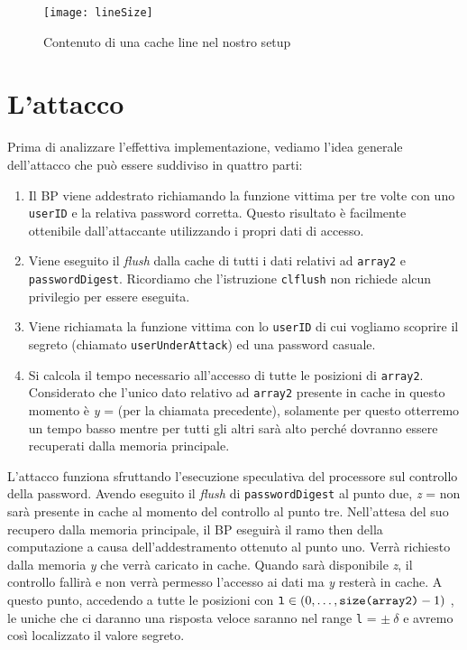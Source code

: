 		\begin{figure}
			\begin{center}
				\texttt{[image: lineSize]}
				\caption{Contenuto di una cache line nel nostro setup}
				\label{fig:lineSize}
			\end{center}
		\end{figure}
		
		\section{L'attacco}
			Prima di analizzare l'effettiva implementazione, vediamo l'idea generale dell'attacco che può essere suddiviso in quattro parti:
			
			\begin{enumerate}
				\item Il \ac{BP} viene addestrato richiamando la funzione vittima per tre volte con uno \texttt{userID} e la relativa password corretta. Questo risultato è facilmente ottenibile dall'attaccante utilizzando i propri dati di accesso.
				\item Viene eseguito il \emph{flush} dalla cache di tutti i dati relativi ad \texttt{array2} e \texttt{passwordDigest}. Ricordiamo che l'istruzione \texttt{clflush} non richiede alcun privilegio per essere eseguita.
				\item Viene richiamata la funzione vittima con lo \texttt{userID} di cui vogliamo scoprire il segreto (chiamato \texttt{userUnderAttack}) ed una password casuale.
				\item Si calcola il tempo necessario all'accesso di tutte le posizioni di \texttt{array2}. Considerato che l'unico dato relativo ad \texttt{array2} presente in cache in questo momento è \emph{y} =  (per la chiamata precedente), solamente per questo otterremo un tempo basso mentre per tutti gli altri sarà alto perché dovranno essere recuperati dalla memoria principale.
			\end{enumerate}
		
			L'attacco funziona sfruttando l'esecuzione speculativa del processore sul controllo della password. Avendo eseguito il \emph{flush} di \texttt{passwordDigest} al punto due, \emph{z} =  non sarà presente in cache al momento del controllo al punto tre. Nell'attesa del suo recupero dalla memoria principale, il \ac{BP} eseguirà il ramo then della computazione a causa dell'addestramento ottenuto al punto uno. Verrà richiesto dalla memoria \emph{y} che verrà caricato in cache. Quando sarà disponibile \emph{z}, il controllo fallirà e non verrà permesso l'accesso ai dati ma \emph{y} resterà in cache. A questo punto, accedendo a tutte le posizioni  con $\text{\texttt{l}} \in (0,\dots,\text{\texttt{size(array2)}}-1)$ , le uniche che ci daranno una risposta veloce saranno nel range \texttt{l} =  $\pm \ \delta$ e avremo così localizzato il valore segreto.
			
